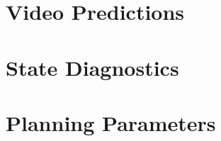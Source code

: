 \clearpage
\section{Video Predictions}
\label{sec:prediction}


\clearpage
\section{State Diagnostics}



\clearpage
\section{Planning Parameters}


